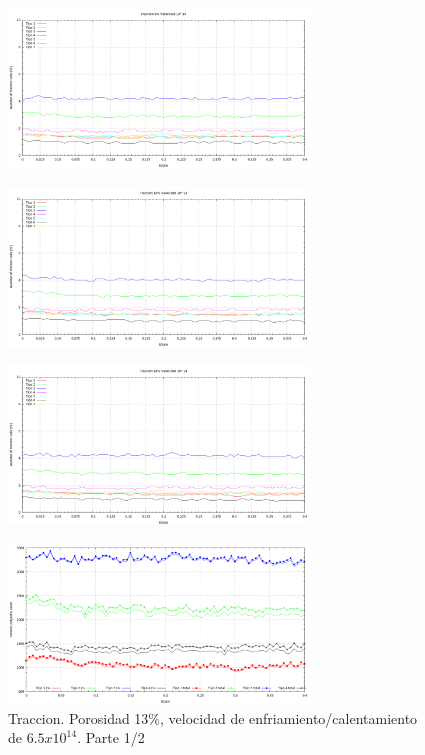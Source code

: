 \documentclass[10pt, oneside]{article} %
\begin{document}
\begin{figure}[H]
\centering
\includegraphics[width=8cm]{Figures/Porosidad/Porosidad_2vel_trac_voronoi4.png}
\caption{}
\end{figure}

\begin{figure}[H]
\centering
\includegraphics[width=8cm]{Figures/Porosidad/Porosidad_2vel_trac_voronoi5.png}
\caption{}
\end{figure}

\begin{figure}[H]
\centering
\includegraphics[width=8cm]{Figures/Porosidad/Porosidad_2vel_trac_voronoi6.png}
\caption{}
\label{fg:9trac}
\end{figure}

\begin{figure}[H]
\centering
\includegraphics[width=8cm]{Figures/Porosidad/Porosidad_2vel_voronoi_13_14_trac.png}
\caption{Traccion. Porosidad 13\%, velocidad de enfriamiento/calentamiento de $6.5x10^{14}$. Parte 1/2}
\label{fg:10trac}
\end{figure}
\end{document}
